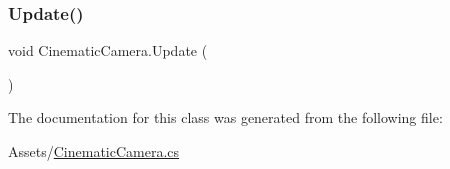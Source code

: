\subsubsection{\texorpdfstring{Update()}{Update()}}
{\footnotesize\ttfamily void Cinematic\+Camera.\+Update (\begin{DoxyParamCaption}{ }\end{DoxyParamCaption})\hspace{0.3cm}{\ttfamily [private]}}



The documentation for this class was generated from the following file\+:\begin{DoxyCompactItemize}
\item 
Assets/\hyperlink{_cinematic_camera_8cs}{Cinematic\+Camera.\+cs}\end{DoxyCompactItemize}
